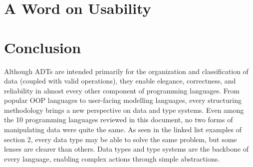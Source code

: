 \documentclass{article}
\begin{document}
\section{A Word on Usability}



\section{Conclusion}

Although ADTs are intended primarily for the organization and classification of data (coupled with valid operations),
they enable elegance, correctness, and reliability in almost every other component of programming languages.
From popular OOP languages to user-facing modelling languages, every structuring methodology
brings a new perspective on data and type systems. Even among the 10 programming languages
reviewed in this document, no two forms of manipulating data were quite the same.
As seen in the linked list examples of section 2, every data type may be able to solve the same problem,
but some lenses are clearer than others. Data types and type systems are the backbone of every language,
enabling complex actions through simple abstractions.

\pagebreak
\nocite{*} %
\printbibliography %
\end{document}
